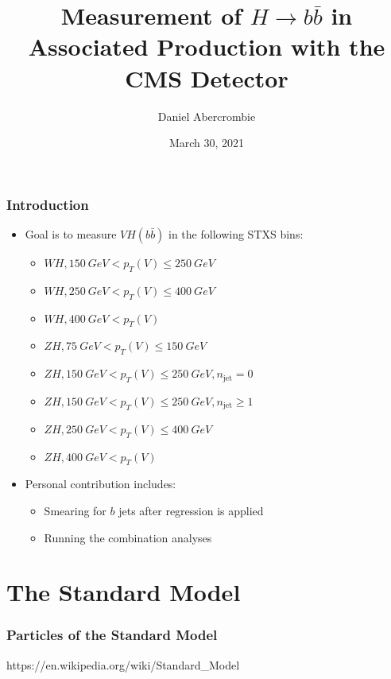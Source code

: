 \documentclass{beamer}
\author[D. Abercrombie]{
  Daniel Abercrombie
}
\title{\bf \sffamily Measurement of $H\rightarrow b\bar{b}$ in \\ Associated Production with the CMS Detector}
\date{March 30, 2021}
\begin{document}
\begin{frame}
  \titlepage
\end{frame}

\begin{frame}
  \frametitle{Introduction}

  \begin{itemize}
  \item Goal is to measure $VH(b\bar{b})$ in the following STXS bins:
    \begin{itemize}
    \item $WH, \SI{150}{GeV} < p_T(V) \le \SI{250}{GeV}$
    \item $WH, \SI{250}{GeV} < p_T(V) \le \SI{400}{GeV}$
    \item $WH, \SI{400}{GeV} < p_T(V)$
    \item $ZH, \SI{75}{GeV} < p_T(V) \le \SI{150}{GeV}$
    \item $ZH, \SI{150}{GeV} < p_T(V) \le \SI{250}{GeV}, n_\mathrm{jet} = 0$
    \item $ZH, \SI{150}{GeV} < p_T(V) \le \SI{250}{GeV}, n_\mathrm{jet} \ge 1$
    \item $ZH, \SI{250}{GeV} < p_T(V) \le \SI{400}{GeV}$
    \item $ZH, \SI{400}{GeV} < p_T(V)$
    \end{itemize}
  \item Personal contribution includes:
    \begin{itemize}
    \item Smearing for $b$ jets after regression is applied
    \item Running the combination analyses
    \end{itemize}
  \end{itemize}

\end{frame}

\section{The Standard Model}

\begin{frame}
  \frametitle{Particles of the Standard Model}

  \centering
  \tiny{https://en.wikipedia.org/wiki/Standard\_Model}

\end{frame}
\end{document}
